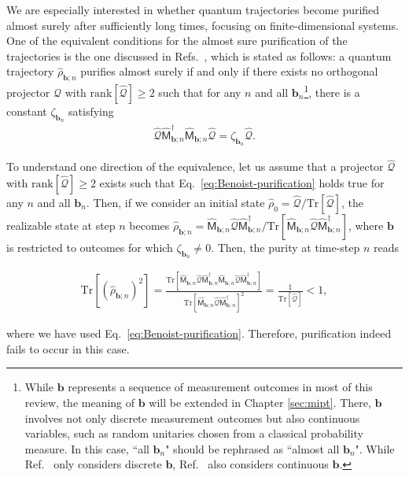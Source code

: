 \documentclass[preprint,pteplogo]{ptephy_v2}%
\numberwithin{equation}{section}
\theoremstyle{definition}
\newcommand{\mc}[1]{\mathcal{#1}}
\newcommand{\mr}[1]{\mathrm{#1}}
\newcommand{\lrs}[1]{\left( #1 \right)}
\newcommand{\lrl}[1]{\left[ #1 \right]}
\newcommand{\aln}[1]{
\begin{align}
#1
\end{align}
}
\newcommand{\Tr}{\mr{Tr}}
\begin{document}
We are especially interested in whether quantum trajectories become purified almost surely after sufficiently long times, focusing on finite-dimensional systems.
One of the equivalent conditions for the almost sure purification of the trajectories is the one discussed in Refs.~\cite{maassen2006purification, benoist2019invariant}, which is stated as follows:
a quantum trajectory $\hat{\rho}_{\bm{b};n}$ purifies almost surely if and only if there exists no orthogonal projector $\hat{\mathcal{Q}}$ with $\mr{rank}[\hat{\mc{Q}}] \geq 2$ such that for any $n$ and all $\bm{b}_n$\footnote{
While $\bm{b}$ represents a sequence of measurement outcomes in most of this review, the meaning of $\bm{b}$ will be extended in Chapter \ref{sec:mipt}.
There, $\bm{b}$ involves not only discrete measurement outcomes but also continuous variables, such as random unitaries chosen from a classical probability measure.
In this case, ``all $\bm{b}_n$" should be rephrased as ``almost all $\bm{b}_n$".
While Ref.~\cite{maassen2006purification} only considers discrete $\bm{b}$, Ref.~\cite{benoist2019invariant} also considers continuous $\bm{b}$.
}, there is a constant $\zeta_{\bm{b}_n}$ satisfying 
\begin{align}
\hat{\mathcal{Q}}\hat{\mathsf{M}}_{\bm{b};n}^\dagger\hat{\mathsf{M}}_{\bm{b};n}\hat{\mathcal{Q}}=\zeta_{\bm{b}_n}\hat{\mathcal{Q}}.
\label{eq:Benoist-purification}
\end{align}

To understand one direction of the equivalence, let us assume that a projector $\hat{\mc{Q}}$ with $\mathrm{rank}[\hat{\mc{Q}}]\geq 2$ exists such that Eq.~\eqref{eq:Benoist-purification} holds true for any $n$ and all $\bm{b}_n$.
Then, if we consider an initial state $\hat{\rho}_0=\hat{\mc{Q}}/\mr{Tr}[\hat{\mc{Q}}]$, the realizable state at step $n$ becomes $\hat{\rho}_{\bm{b};n}={\hat{\mathsf{M}}_{\bm{b};n}\hat{\mc{Q}}\hat{\mathsf{M}}_{\bm{b};n}^\dag}/\mr{Tr}[\hat{\mathsf{M}}_{\bm{b};n}\hat{\mc{Q}}\hat{\mathsf{M}}_{\bm{b};n}^\dag]$, where $\bm{b}$ is restricted to outcomes for which $\zeta_{\bm{b}_n}\neq 0$.
Then, the purity at time-step $n$ reads
\aln{
\Tr\lrl{\lrs{\hat{\rho}_{\bm{b};n}}^2}=\frac{\mr{Tr}[\hat{\mathsf{M}}_{\bm{b};n}\hat{\mc{Q}}\hat{\mathsf{M}}_{\bm{b};n}^\dag\hat{\mathsf{M}}_{\bm{b};n}\hat{\mc{Q}}\hat{\mathsf{M}}_{\bm{b};n}^\dag]}{\mr{Tr}[\hat{\mathsf{M}}_{\bm{b};n}\hat{\mc{Q}}\hat{\mathsf{M}}_{\bm{b};n}^\dag]^2}=\frac{1}{\Tr[\mc{\hat{Q}}]}<1,
}
where we have used Eq.~\eqref{eq:Benoist-purification}.
Therefore, purification indeed fails to occur in this case.
\end{document}
